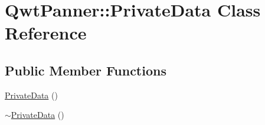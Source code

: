 \hypertarget{class_qwt_panner_1_1_private_data}{\section{Qwt\-Panner\-:\-:Private\-Data Class Reference}
\label{class_qwt_panner_1_1_private_data}
}
\subsection*{Public Member Functions}
\begin{DoxyCompactItemize}
\item 
\hyperlink{class_qwt_panner_1_1_private_data_a84872491d18e1b39c16be8fc9a27d5f3}{Private\-Data} ()
\item 
\hyperlink{class_qwt_panner_1_1_private_data_a60d0049cbbe0eb1efc7b4058c7c73f98}{$\sim$\-Private\-Data} ()
\end{DoxyCompactItemize}
